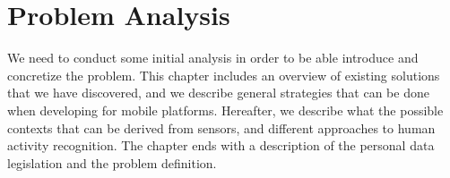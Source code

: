 
\chapter{Problem Analysis}
\label{cha:problem_analysis}

We need to conduct some initial analysis in order to be able introduce and concretize the problem. This chapter includes an overview of existing solutions that we have discovered, and we describe general strategies that can be done when developing for mobile platforms. Hereafter, we describe what the possible contexts that can be derived from sensors, and different approaches to human activity recognition. The chapter ends with a description of the personal data legislation and the problem definition.












